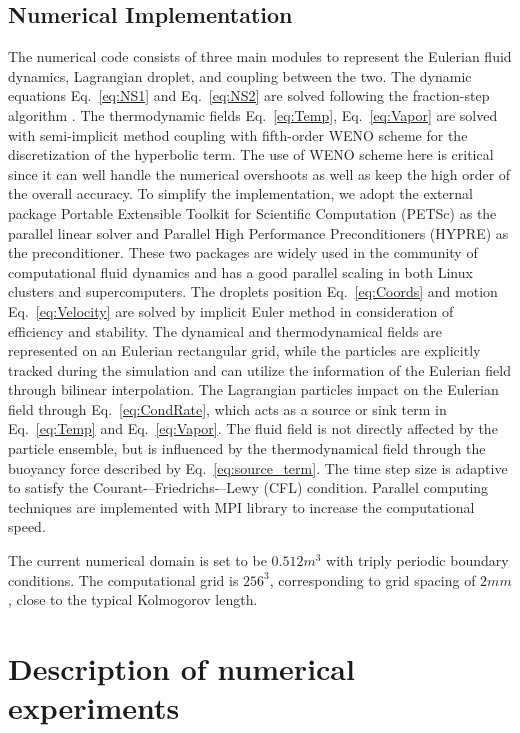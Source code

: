 \documentclass[draft,jgrga]{AGUTeX}
\newcommand{\Eq}[1]{Eq.~\eqref{#1}} \newcommand{\Fig}[1]{Figure~\ref{#1}}
\begin{document}
\begin{article}
\subsection{Numerical Implementation}
The numerical code consists of three main modules to represent the Eulerian fluid dynamics, Lagrangian droplet, and coupling between the two. The dynamic equations \Eq{eq:NS1} and \Eq{eq:NS2} are solved following the fraction-step algorithm \cite{Brown2001}. The thermodynamic fields \Eq{eq:Temp}, \Eq{eq:Vapor} are solved with semi-implicit method coupling with fifth-order WENO scheme for the discretization of the hyperbolic term. The use of WENO scheme here is critical since it can well handle the numerical overshoots as well as keep the high order of the overall accuracy. To simplify the implementation, we adopt the external package Portable Extensible Toolkit for Scientific Computation (PETSc) \cite{petsc_cite} as the parallel linear solver and Parallel High Performance Preconditioners (HYPRE) \cite{hypre_cite} as the preconditioner. These two packages are widely used in the community of computational fluid dynamics and has a good parallel scaling in both Linux clusters and supercomputers. The droplets position \Eq{eq:Coords} and motion \Eq{eq:Velocity} are solved by implicit Euler method in consideration of efficiency and stability. The dynamical and thermodynamical fields are represented on an Eulerian rectangular grid, while the particles are explicitly tracked during the simulation and can utilize the information of the Eulerian field through bilinear interpolation. The Lagrangian particles impact on the Eulerian field through \Eq{eq:CondRate}, which acts as a source or sink term in \Eq{eq:Temp} and \Eq{eq:Vapor}. The fluid field is not directly affected by the particle ensemble, but is influenced by the thermodynamical field through the buoyancy force described by \Eq{eq:source_term}. The time step size is adaptive to satisfy the Courant-–Friedrichs-–Lewy (CFL) condition. Parallel computing techniques are implemented with MPI library to increase the computational speed.

The current numerical domain is set to be $0.512m^{3}$ with triply periodic boundary conditions. The computational grid is $256^{3}$, corresponding to grid spacing of $2mm$, close to the typical Kolmogorov length.

\section{Description of numerical experiments}\label{experiment_description}


\end{article}
\end{document}
